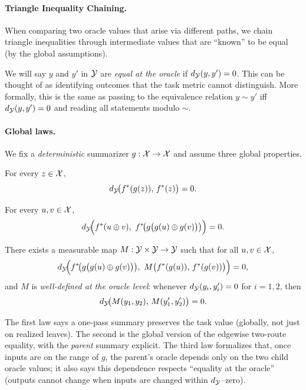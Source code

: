 \paragraph{Triangle Inequality Chaining.}
When comparing two oracle values that arise via different paths, we chain triangle inequalities through intermediate values that are ``known'' to be equal (by the global assumptions).

\begin{remark}
We will say $y$ and $y'$ in $\mathcal{Y}$ are \emph{equal at the oracle} if $d_{\mathcal{Y}}(y,y')=0$. This can be thought of as identifying outcomes that the task metric cannot distinguish. More formally, this is the same as passing to the equivalence relation $y\sim y'$ iff $d_{\mathcal{Y}}(y,y')=0$ and reading all statements modulo $\sim$.
\end{remark}

\paragraph{Global laws.} We fix a \emph{deterministic} summarizer $g:\mathcal{X}\to\mathcal{X}$ and assume three global properties.

\begin{assumption}\label{ass:app1}
For every $z\in\mathcal{X}$,
\[
d_{\mathcal{Y}}\!\big(f^{\ast}(g(z)),\,f^{\ast}(z)\big)=0.
\]
\end{assumption}

\begin{assumption}\label{ass:app2}
For every $u,v\in\mathcal{X}$,
\[
\metric\!\Big(\fstar(u\concat v),\ \fstar\!\big(g\big(g(u)\concat g(v)\big)\big)\Big)=0.
\]
\end{assumption}

\begin{assumption}\label{ass:app3}
There exists a measurable map $M:\mathcal{Y}\times\mathcal{Y}\to\mathcal{Y}$ such that for all $u,v\in\mathcal{X}$,
\[
d_{\mathcal{Y}}\!\Big(f^{\ast}\!\big(g\big(g(u)\oplus g(v)\big)\big),\ M\big(f^{\ast}(g(u)),\,f^{\ast}(g(v))\big)\Big)=0,
\]
and $M$ is \emph{well-defined at the oracle level}: whenever $d_{\mathcal{Y}}(y_i,y_i')=0$ for $i=1,2$, then
\[
d_{\mathcal{Y}}\!\big(M(y_1,y_2),\,M(y_1',y_2')\big)=0.
\]
\end{assumption}

The first law says a one-pass summary preserves the task value (globally, not just on realized leaves). The second is the global version of the edgewise two-route equality, with the \emph{parent} summary explicit. The third law formalizes that, once inputs are on the range of $g$, the parent’s oracle depends only on the two child oracle values; it also says this dependence respects ``equality at the oracle'' (outputs cannot change when inputs are changed within $d_{\mathcal{Y}}$–zero).

